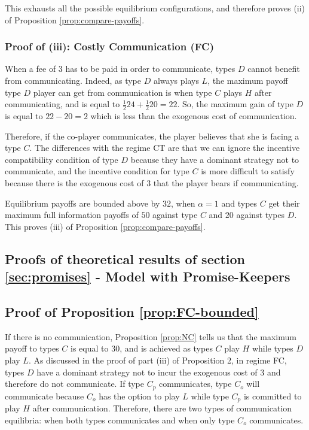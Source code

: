 \documentclass[12pt]{article}
\theoremstyle{break}
\begin{document}
This exhausts all the possible equilibrium configurations, and therefore proves (ii) of Proposition \ref{prop:compare-payoffs}.


\subsubsection*{Proof of (iii): Costly Communication (FC)}
When a fee of $3$ has to be paid in order to communicate, types $D$ cannot benefit from communicating. Indeed, as type $D$ always plays $L$, the maximum payoff type $D$ player can get from communication is when type $C$ plays $H$ after communicating, and is equal to $\frac{1}{2}24 +\frac{1}{2}20=22$. So, the maximum gain of type $D$ is equal to $22-20=2$ which is less than the exogenous cost of communication.

Therefore, if the co-player communicates, the player believes that she is facing a type $C$. The differences with the regime CT are that we can ignore the incentive compatibility condition of type $D$ because they have a dominant strategy not to communicate, and the incentive condition for type $C$ is more difficult to satisfy because there is the exogenous cost of $3$ that the player bears if communicating.  

Equilibrium payoffs are bounded above by $32$, when $\alpha=1$ and types $C$ get their maximum full information payoffs of $50$ against type $C$ and $20$ against types $D$. This proves (iii) of Proposition \ref{prop:compare-payoffs}.

%   
%    
\subsection{Proofs of theoretical results of section \ref{sec:promises}  - Model with Promise-Keepers}

\subsection*{Proof of Proposition \ref{prop:FC-bounded}}

	If there is no communication, Proposition \ref{prop:NC} tells us that the maximum payoff to types $C$ is equal to $30$, and is achieved as types $C$ play $H$ while types $D$ play $L$. As discussed in the proof of part (iii) of Proposition 2, in regime FC, types $D$ have a dominant strategy not to incur the exogenous cost of $3$ and therefore do not communicate. If type $C_p$ communicates, type $C_o$ will communicate because $C_o$ has the option to play $L$ while type $C_p$ is committed to play $H$ after communication. Therefore, there are two types of communication equilibria: when both types communicates and when only type $C_o$ communicates. 
	
\end{document}
